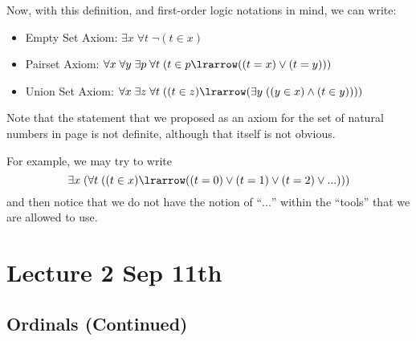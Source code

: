\documentclass[notoc,notitlepage]{tufte-book}
\begin{document}
Now, with this definition, and first-order logic notations in mind, we can write:

\begin{itemize}
  \item Empty Set Axiom: $\exists x \; \forall t \; \neg ( t \in x )$
  \item Pairset Axiom: $\forall x \; \forall y \; \exists p \; \forall t \; ( t \in p \lrarrow ( ( t = x ) \lor ( t = y ) ) )$
    \item Union Set Axiom: $\forall x \; \exists z \; \forall t \; ( ( t \in z ) \lrarrow ( \exists y \; ( (y \in x) \land ( t \in y ) ) ) )$
\end{itemize}

Note that the statement that we proposed as an axiom for the set of natural numbers in page \pageref{sp:natural_numbers_axiom} is not definite, although that itself is not obvious.

For example, we may try to write
\begin{equation*}
  \exists x \; ( \forall t \; ( ( t \in x ) \lrarrow ( (t = 0) \lor (t = 1) \lor ( t = 2 ) \lor ... ) ) )
\end{equation*}
and then notice that we do not have the notion of ``$...$'' within the ``tools'' that we are allowed to use.




\chapter{Lecture 2 Sep 11th}%
\label{chp:lecture_2_sep_11th}

\section{Ordinals (Continued)}%
\label{sec:ordinals_continued}
\end{document}
